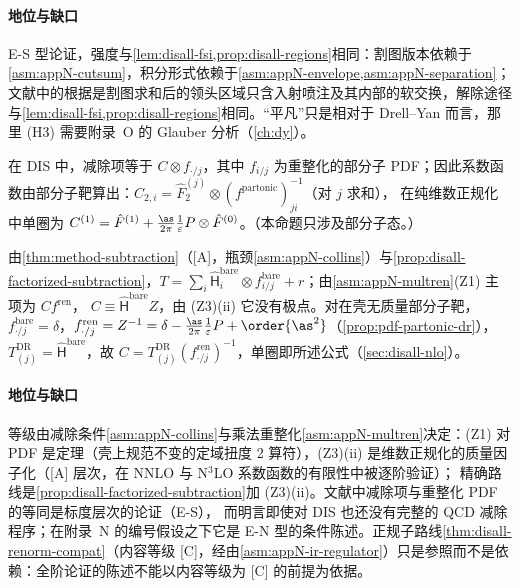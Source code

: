 \paragraph{地位与缺口}
E-S 型论证，强度与\cref{lem:disall-fsi,prop:disall-regions}相同：割图版本依赖于\cref{asm:appN-cutsum}，积分形式依赖于\cref{asm:appN-envelope,asm:appN-separation}；
文献中的根据是割图求和后的领头区域只含入射喷注及其内部的软交换\cite[第~8.7~节]{CollinsSoperSterman1989}，解除途径与\cref{lem:disall-fsi,prop:disall-regions}相同。“平凡”只是相对于 Drell--Yan 而言，那里 (H3) 需要附录~O 的 Glauber 分析（\cref{ch:dy}）。

\begin{proposition}\label{prop:disall-h5}
在 DIS 中，减除项等于 $C\otimes f_{\cdot/j}$，其中 $f_{i/j}$ 为重整化的部分子 PDF；因此系数函数由部分子靶算出：$C_{2,i}=\hat F_2^{(j)}\otimes(f^{\mathrm{partonic}})^{-1}_{ji}$（对 $j$ 求和），
在纯维数正规化中单圈为 $C^{(1)}=\hat F^{(1)}+\frac{\as}{2\pi}\frac1\varepsilon P\otimes\hat F^{(0)}$。（本命题只涉及部分子态。）
\end{proposition}

\begin{proofsketch}
由\cref{thm:method-subtraction}（[A]，瓶颈\cref{asm:appN-collins}）与\cref{prop:disall-factorized-subtraction}，$T=\sum_i\hat{\mathsf H}^{\mathrm{bare}}_i\otimes f^{\mathrm{bare}}_{i/j}+r$；由\cref{asm:appN-multren}(Z1) 主项为 $Cf^{\mathrm{ren}}$，
$C\equiv\hat{\mathsf H}^{\mathrm{bare}}Z$，由 (Z3)(ii) 它没有极点。对在壳无质量部分子靶，$f^{\mathrm{bare}}_{\cdot/j}=\delta$，$f^{\mathrm{ren}}_{\cdot/j}=Z^{-1}=\delta-\frac{\as}{2\pi}\frac1\varepsilon P+\order{\as^2}$（\cref{prop:pdf-partonic-dr}），
$T^{\mathrm{DR}}_{(j)}=\hat{\mathsf H}^{\mathrm{bare}}$，故 $C=T^{\mathrm{DR}}_{(j)}(f^{\mathrm{ren}}_{\cdot/j})^{-1}$，单圈即所述公式（\cref{sec:disall-nlo}）。
\end{proofsketch}

\paragraph{地位与缺口}
等级由减除条件\cref{asm:appN-collins}与乘法重整化\cref{asm:appN-multren}决定：(Z1) 对 PDF 是定理（壳上规范不变的定域扭度 2 算符），(Z3)(ii) 是维数正规化的质量因子化（[A] 层次，在 NNLO 与 N$^3$LO 系数函数的有限性中被逐阶验证）；
精确路线是\cref{prop:disall-factorized-subtraction}加 (Z3)(ii)。文献中减除项与重整化 PDF 的等同是标度层次的论证（E-S）\cite[第~10~章]{Collins2011}，
而\cite[第~10.1~节]{CollinsSoperSterman1989}明言即使对 DIS 也还没有完整的 QCD 减除程序；在附录~N 的编号假设之下它是 E-N 型的条件陈述。正规子路线\cref{thm:disall-renorm-compat}（内容等级 [C]，经由\cref{asm:appN-ir-regulator}）只是参照而不是依赖：全阶论证的陈述不能以内容等级为 [C] 的前提为依据。

